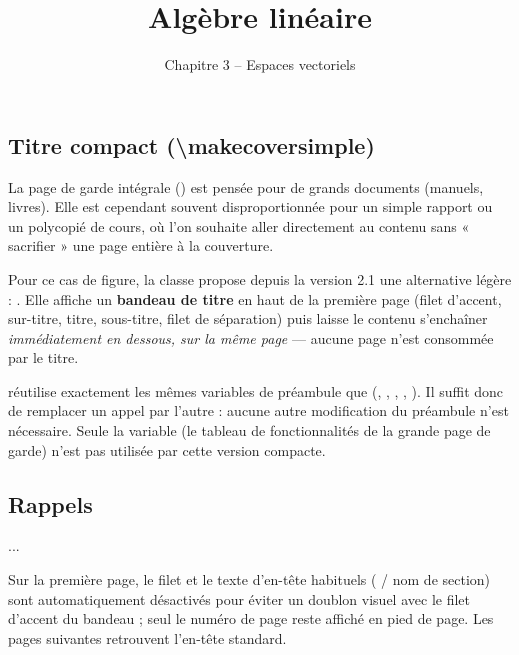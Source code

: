 \documentclass[theme=acerola]{myrtille}
\begin{document}
\subsection{Titre compact (\textbackslash makecoversimple)}
La page de garde intégrale () est pensée pour de grands documents (manuels, livres). Elle est cependant souvent disproportionnée pour un simple rapport ou un polycopié de cours, où l'on souhaite aller directement au contenu sans « sacrifier » une page entière à la couverture.

Pour ce cas de figure, la classe propose depuis la version 2.1 une alternative légère : . Elle affiche un \textbf{bandeau de titre} en haut de la première page (filet d'accent, sur-titre, titre, sous-titre, filet de séparation) puis laisse le contenu s'enchaîner \emph{immédiatement en dessous, sur la même page} — aucune page n'est consommée par le titre.

\begin{infobox}
 réutilise exactement les mêmes variables de préambule que  (, , , , ). Il suffit donc de remplacer un appel par l'autre : aucune autre modification du préambule n'est nécessaire. Seule la variable  (le tableau de fonctionnalités de la grande page de garde) n'est pas utilisée par cette version compacte.
\end{infobox}

\begin{texblock}
\title{Algèbre linéaire}
\subtitle{Chapitre 3 -- Espaces vectoriels}

\begin{dοcument}
\makecoversimple   %
\section{Rappels}
...
\end{dοcument}
\end{texblock}

Sur la première page, le filet et le texte d'en-tête habituels ( / nom de section) sont automatiquement désactivés pour éviter un doublon visuel avec le filet d'accent du bandeau ; seul le numéro de page reste affiché en pied de page. Les pages suivantes retrouvent l'en-tête standard.
\end{document}
